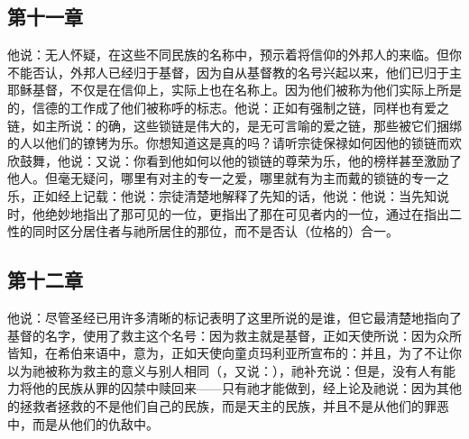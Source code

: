 
\subsection{第十一章}

\par

他说：无人怀疑，在这些不同民族的名称中，预示着将信仰的外邦人的来临。但你不能否认，外邦人已经归于基督，因为自从基督教的名号兴起以来，他们已归于主耶稣基督，不仅是在信仰上，实际上也在名称上。因为他们被称为他们实际上所是的，信德的工作成了他们被称呼的标志。他说：正如有强制之链，同样也有爱之链，如主所说：的确，这些锁链是伟大的，是无可言喻的爱之链，那些被它们捆绑的人以他们的镣铐为乐。你想知道这是真的吗？请听宗徒保禄如何因他的锁链而欢欣鼓舞，他说：又说：你看到他如何以他的锁链的尊荣为乐，他的榜样甚至激励了他人。但毫无疑问，哪里有对主的专一之爱，哪里就有为主而戴的锁链的专一之乐，正如经上记载：他说：宗徒清楚地解释了先知的话，他说：他说：当先知说时，他绝妙地指出了那可见的一位，更指出了那在可见者内的一位，通过在指出二性的同时区分居住者与祂所居住的那位，而不是否认（位格的）合一。\par


\subsection{第十二章}

\par

他说：尽管圣经已用许多清晰的标记表明了这里所说的是谁，但它最清楚地指向了基督的名字，使用了救主这个名号：因为救主就是基督，正如天使所说：因为众所皆知，在希伯来语中，意为，正如天使向童贞玛利亚所宣布的：并且，为了不让你以为祂被称为救主的意义与别人相同（，又说：），祂补充说：但是，没有人有能力将他的民族从罪的囚禁中赎回来——只有祂才能做到，经上论及祂说：因为其他的拯救者拯救的不是他们自己的民族，而是天主的民族，并且不是从他们的罪恶中，而是从他们的仇敌中。\par

